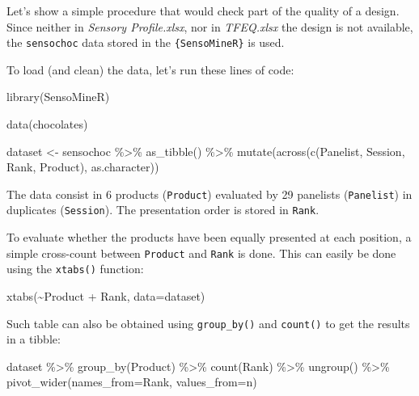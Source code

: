 \documentclass[
]{book}
\newenvironment{Shaded}{\begin{snugshade}}{\end{snugshade}}
\newcommand{\AttributeTok}[1]{\textcolor[rgb]{0.77,0.63,0.00}{#1}}
\newcommand{\FunctionTok}[1]{\textcolor[rgb]{0.00,0.00,0.00}{#1}}
\newcommand{\NormalTok}[1]{#1}
\newcommand{\OtherTok}[1]{\textcolor[rgb]{0.56,0.35,0.01}{#1}}
\newcommand{\SpecialCharTok}[1]{\textcolor[rgb]{0.00,0.00,0.00}{#1}}
\begin{document}
Let's show a simple procedure that would check part of the quality of a design.
Since neither in \emph{Sensory Profile.xlsx}, nor in \emph{TFEQ.xlsx} the design is not available, the \texttt{sensochoc} data stored in the \texttt{\{SensoMineR\}} is used.

To load (and clean) the data, let's run these lines of code:

\begin{Shaded}
\begin{Highlighting}[]
\FunctionTok{library}\NormalTok{(SensoMineR)}

\FunctionTok{data}\NormalTok{(chocolates)}

\NormalTok{dataset }\OtherTok{\textless{}{-}}\NormalTok{ sensochoc }\SpecialCharTok{\%\textgreater{}\%} 
  \FunctionTok{as\_tibble}\NormalTok{() }\SpecialCharTok{\%\textgreater{}\%} 
  \FunctionTok{mutate}\NormalTok{(}\FunctionTok{across}\NormalTok{(}\FunctionTok{c}\NormalTok{(Panelist, Session, Rank, Product), as.character))}
\end{Highlighting}
\end{Shaded}

The data consist in 6 products (\texttt{Product}) evaluated by 29 panelists (\texttt{Panelist}) in duplicates (\texttt{Session}). The presentation order is stored in \texttt{Rank}.

To evaluate whether the products have been equally presented at each position, a simple cross-count between \texttt{Product} and \texttt{Rank} is done. This can easily be done using the \texttt{xtabs()} function:

\begin{Shaded}
\begin{Highlighting}[]
\FunctionTok{xtabs}\NormalTok{(}\SpecialCharTok{\textasciitilde{}}\NormalTok{Product }\SpecialCharTok{+}\NormalTok{ Rank, }\AttributeTok{data=}\NormalTok{dataset)}
\end{Highlighting}
\end{Shaded}

Such table can also be obtained using \texttt{group\_by()} and \texttt{count()} to get the results in a tibble:

\begin{Shaded}
\begin{Highlighting}[]
\NormalTok{dataset }\SpecialCharTok{\%\textgreater{}\%} 
  \FunctionTok{group\_by}\NormalTok{(Product) }\SpecialCharTok{\%\textgreater{}\%} 
  \FunctionTok{count}\NormalTok{(Rank) }\SpecialCharTok{\%\textgreater{}\%} 
  \FunctionTok{ungroup}\NormalTok{() }\SpecialCharTok{\%\textgreater{}\%} 
  \FunctionTok{pivot\_wider}\NormalTok{(}\AttributeTok{names\_from=}\NormalTok{Rank, }\AttributeTok{values\_from=}\NormalTok{n)}
\end{Highlighting}
\end{Shaded}
\end{document}
